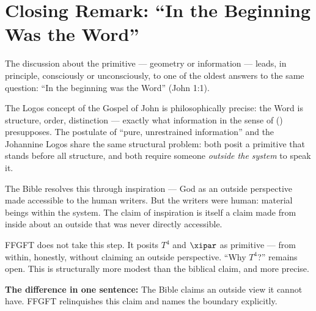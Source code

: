 \section*{Closing Remark: ``In the Beginning Was the Word''}

The discussion about the primitive --- geometry or information --- leads, in principle, consciously or unconsciously, to one of the oldest answers to the same question: ``In the beginning was the Word'' (John 1:1).

The Logos concept of the Gospel of John is philosophically precise: the Word is structure, order, distinction --- exactly what information in the sense of \citeauthor{Shannon1948} (\citeyear{Shannon1948}) presupposes. The postulate of ``pure, unrestrained information'' and the Johannine Logos share the same structural problem: both posit a primitive that stands before all structure, and both require someone \emph{outside the system} to speak it.

The Bible resolves this through inspiration --- God as an outside perspective made accessible to the human writers. But the writers were human: material beings within the system. The claim of inspiration is itself a claim made from inside about an outside that was never directly accessible.

FFGFT does not take this step. It posits $T^4$ and $\xipar$ as primitive --- from within, honestly, without claiming an outside perspective. ``Why $T^4$?'' remains open. This is structurally more modest than the biblical claim, and more precise.

\begin{erkenntnis}
\textbf{The difference in one sentence:} The Bible claims an outside view it cannot have. FFGFT relinquishes this claim and names the boundary explicitly.
\end{erkenntnis}


